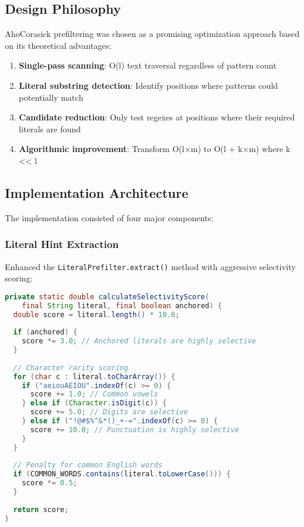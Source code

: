 \documentclass[11pt,a4paper]{article}
\begin{document}
\subsection{Design Philosophy}

AhoCorasick prefiltering was chosen as a promising optimization approach based on its theoretical advantages:

\begin{enumerate}
\item \textbf{Single-pass scanning}: O(l) text traversal regardless of pattern count
\item \textbf{Literal substring detection}: Identify positions where patterns could potentially match
\item \textbf{Candidate reduction}: Only test regexes at positions where their required literals are found
\item \textbf{Algorithmic improvement}: Transform O(l×m) to O(l + k×m) where k << l
\end{enumerate}

\subsection{Implementation Architecture}

The implementation consisted of four major components:

\subsubsection{Literal Hint Extraction}
Enhanced the \texttt{LiteralPrefilter.extract()} method with aggressive selectivity scoring:

\begin{lstlisting}[language=Java, caption=Selectivity-based literal extraction]
private static double calculateSelectivityScore(
    final String literal, final boolean anchored) {
  double score = literal.length() * 10.0;
  
  if (anchored) {
    score *= 3.0; // Anchored literals are highly selective
  }
  
  // Character rarity scoring
  for (char c : literal.toCharArray()) {
    if ("aeiouAEIOU".indexOf(c) >= 0) {
      score += 1.0; // Common vowels
    } else if (Character.isDigit(c)) {
      score += 5.0; // Digits are selective
    } else if ("!@#$%^&*()_+-=".indexOf(c) >= 0) {
      score += 10.0; // Punctuation is highly selective
    }
  }
  
  // Penalty for common English words
  if (COMMON_WORDS.contains(literal.toLowerCase())) {
    score *= 0.5;
  }
  
  return score;
}
\end{lstlisting}
\end{document}
